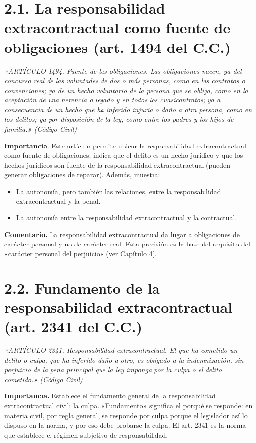 
\section{2.1. La responsabilidad extracontractual como fuente de obligaciones (art. 1494 del C.C.)}
\begin{cita}
\textit{«ARTÍCULO 1494. Fuente de las obligaciones. Las obligaciones nacen, ya del concurso real de las voluntades de dos o más personas, como en los contratos o convenciones; ya de un hecho voluntario de la persona que se obliga, como en la aceptación de una herencia o legado y en todos los cuasicontratos; ya a consecuencia de un hecho que ha inferido injuria o daño a otra persona, como en los delitos; ya por disposición de la ley, como entre los padres y los hijos de familia.» (Código Civil)}
\end{cita}
\textbf{Importancia.} Este artículo permite ubicar la responsabilidad extracontractual como fuente de obligaciones: indica que el delito es un hecho jurídico y que los hechos jurídicos son fuente de la responsabilidad extracontractual (pueden generar obligaciones de reparar). Además, muestra:

\begin{itemize}
\item La autonomía, pero también las relaciones, entre la responsabilidad extracontractual y la penal.
\item La autonomía entre la responsabilidad extracontractual y la contractual.
\end{itemize}
\begin{comentario}
\textcolor[HTML]{8A6D3B}{\textbf{Comentario. }}La responsabilidad extracontractual da lugar a obligaciones de carácter personal y no de carácter real. Esta precisión es la base del requisito del «carácter personal del perjuicio» (ver Capítulo 4).
\end{comentario}
\section{2.2. Fundamento de la responsabilidad extracontractual (art. 2341 del C.C.)}
\begin{cita}
\textit{«ARTÍCULO 2341. Responsabilidad extracontractual. El que ha cometido un delito o culpa, que ha inferido daño a otro, es obligado a la indemnización, sin perjuicio de la pena principal que la ley imponga por la culpa o el delito cometido.» (Código Civil)}
\end{cita}
\textbf{Importancia.} Establece el fundamento general de la responsabilidad extracontractual civil: la culpa. «Fundamento» significa el porqué se responde: en materia civil, por regla general, se responde por culpa porque el legislador así lo dispuso en la norma, y por eso debe probarse la culpa. El art. 2341 es la norma que establece el régimen subjetivo de responsabilidad.

